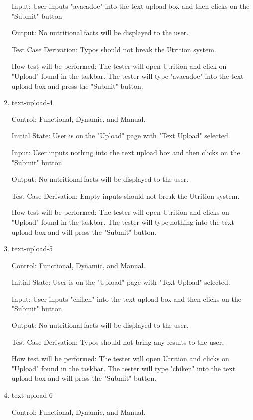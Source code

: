\documentclass[12pt, titlepage]{article}
\begin{document}
\begin{enumerate}
	Input: User inputs "avacadoe" into the text upload box and then clicks on the "Submit" button
	
	Output: No nutritional facts will be displayed to the user.
	
	Test Case Derivation: Typos should not break the Utrition system.
	
	How test will be performed: The tester will open Utrition and click on "Upload" found in the taskbar. The tester will type "avacadoe" into the text upload box and press the "Submit" button.
	
	\item{text-upload-4\\}
	
	Control: Functional, Dynamic, and Manual.
	
	Initial State: User is on the "Upload" page with "Text Upload" selected.
	
	Input: User inputs nothing into the text upload box and then clicks on the "Submit" button
	
	Output: No nutritional facts will be displayed to the user.
	
	Test Case Derivation: Empty inputs should not break the Utrition system.
	
	How test will be performed: The tester will open Utrition and clicks on "Upload" found in the taskbar. The tester will type nothing into the text upload box and will press the "Submit" button.
	
	\item{text-upload-5\\}
	
	Control: Functional, Dynamic, and Manual.
	
	Initial State: User is on the "Upload" page with "Text Upload" selected.
	
	Input: User inputs "chiken" into the text upload box and then clicks on the "Submit" button
	
	Output: No nutritional facts will be displayed to the user.
	
	Test Case Derivation: Typos should not bring any results to the user.
	
	How test will be performed: The tester will open Utrition and clicks on "Upload" found in the taskbar. The tester will type "chiken" into the text upload box and will press the "Submit" button.
	
	\item{text-upload-6\\}
	
	Control: Functional, Dynamic, and Manual.
	

\end{enumerate}
\end{document}
